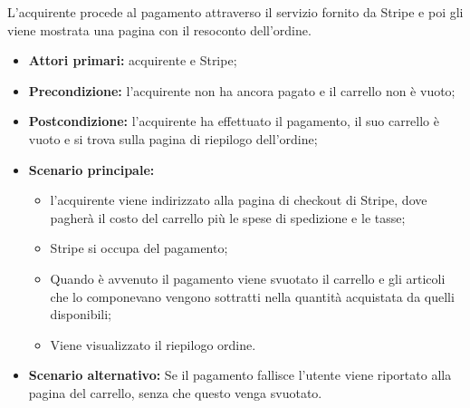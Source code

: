 L'acquirente procede al pagamento attraverso il servizio fornito da Stripe e poi gli viene mostrata una pagina con il resoconto dell'ordine.
\begin{itemize}
    \item \textbf{Attori primari:} acquirente e Stripe;
    \item \textbf{Precondizione:} l'acquirente non ha ancora pagato e il carrello non è vuoto;
    \item \textbf{Postcondizione:} l'acquirente ha effettuato il pagamento, il suo carrello è vuoto e si trova sulla pagina di riepilogo dell'ordine;
    \item \textbf{Scenario principale:}
        \begin{itemize}
            \item l'acquirente viene indirizzato alla pagina di checkout di Stripe, dove pagherà il costo del carrello più le spese di spedizione e le tasse;
            \item Stripe si occupa del pagamento;
            \item Quando è avvenuto il pagamento viene svuotato il carrello e gli articoli che lo componevano vengono sottratti nella quantità acquistata da quelli disponibili;
            \item Viene visualizzato il riepilogo ordine.
        \end{itemize}
    \item \textbf{Scenario alternativo:} Se il pagamento fallisce l'utente viene riportato alla pagina del carrello, senza che questo venga svuotato.
\end{itemize}

